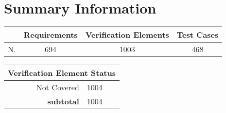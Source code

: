 \newpage
\section{Summary Information}\label{sec:summary}
\begin{longtable}{rccc}
\toprule
 & \textbf{Requirements} & \textbf{Verification Elements} & \textbf{Test Cases} \\ \hline
N.& 694 & 1003 & 468 \\
\bottomrule
\end{longtable}
\begin{longtable}{rl}
\toprule
\multicolumn{2}{c}{\textbf{Verification Element Status}} \\ \hline
 Not Covered & 1004 \\
\hline
\textbf{subtotal} &  1004 \\
\bottomrule
\end{longtable}
